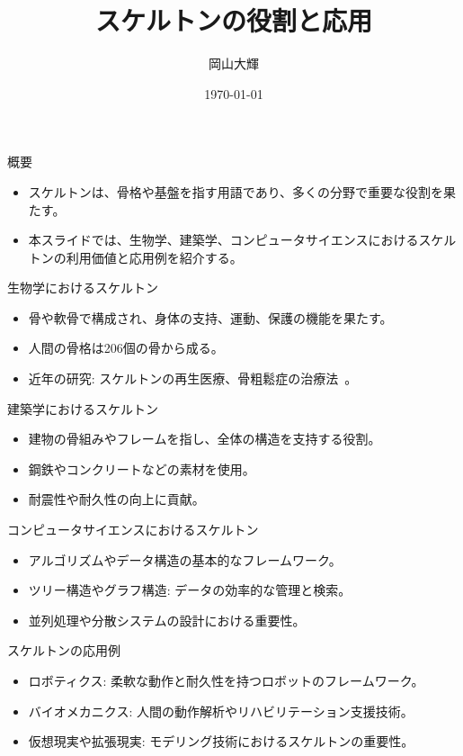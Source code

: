 \documentclass[aspectratio=169]{beamer}
\title{スケルトンの役割と応用}
\author{岡山大輝}
\institute{兵庫県立大学}
\date{\today}
\begin{document}
\begin{frame}
  \titlepage{}
\end{frame}

\begin{frame}{概要}
  \begin{itemize}
    \item スケルトンは、骨格や基盤を指す用語であり、多くの分野で重要な役割を果たす。
    \item 本スライドでは、生物学、建築学、コンピュータサイエンスにおけるスケルトンの利用価値と応用例を紹介する。
  \end{itemize}
\end{frame}

\begin{frame}{生物学におけるスケルトン}
  \begin{itemize}
    \item 骨や軟骨で構成され、身体の支持、運動、保護の機能を果たす。
    \item 人間の骨格は206個の骨から成る。
    \item 近年の研究: スケルトンの再生医療、骨粗鬆症の治療法~\cite{okayama2024how}。
  \end{itemize}
\end{frame}

\begin{frame}{建築学におけるスケルトン}
  \begin{itemize}
    \item 建物の骨組みやフレームを指し、全体の構造を支持する役割。
    \item 鋼鉄やコンクリートなどの素材を使用。
    \item 耐震性や耐久性の向上に貢献。
  \end{itemize}
\end{frame}

\begin{frame}{コンピュータサイエンスにおけるスケルトン}
  \begin{itemize}
    \item アルゴリズムやデータ構造の基本的なフレームワーク。
    \item ツリー構造やグラフ構造: データの効率的な管理と検索。
    \item 並列処理や分散システムの設計における重要性。
  \end{itemize}
\end{frame}

\begin{frame}{スケルトンの応用例}
  \begin{itemize}
    \item ロボティクス: 柔軟な動作と耐久性を持つロボットのフレームワーク。
    \item バイオメカニクス: 人間の動作解析やリハビリテーション支援技術。
    \item 仮想現実や拡張現実: モデリング技術におけるスケルトンの重要性。
  \end{itemize}
\end{frame}
\end{document}
